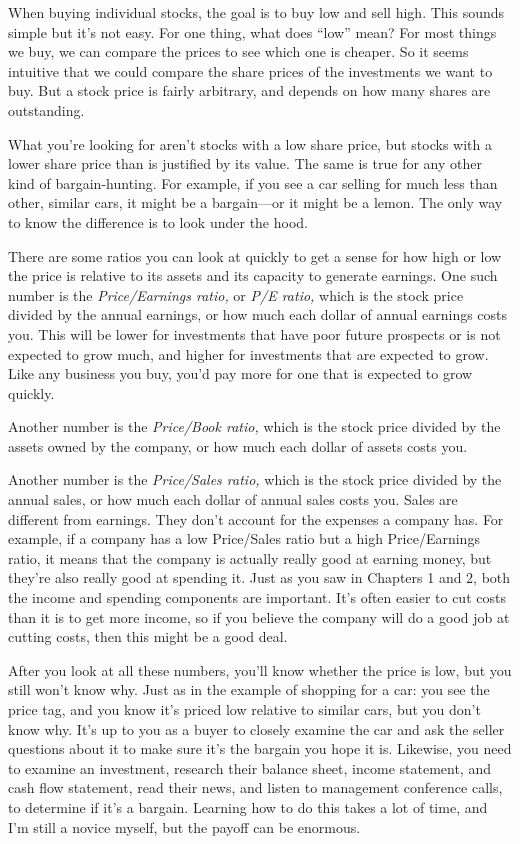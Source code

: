 When buying individual stocks, the goal is to buy low and sell high. This sounds simple but it's not easy. For one thing, what does ``low'' mean? For most things we buy, we can compare the prices to see which one is cheaper. So it seems intuitive that we could compare the share prices of the investments we want to buy. But a stock price is fairly arbitrary, and depends on how many shares are outstanding.

What you're looking for aren't stocks with a low share price, but stocks with a lower share price than is justified by its value. The same is true for any other kind of bargain-hunting. For example, if you see a car selling for much less than other, similar cars, it might be a bargain---or it might be a lemon. The only way to know the difference is to look under the hood.

There are some ratios you can look at quickly to get a sense for how high or low the price is relative to its assets and its capacity to generate earnings. One such number is the \emph{Price/Earnings ratio,} or \emph{P/E ratio,} which is the stock price divided by the annual earnings, or how much each dollar of annual earnings costs you. This will be lower for investments that have poor future prospects or is not expected to grow much, and higher for investments that are expected to grow. Like any business you buy, you'd pay more for one that is expected to grow quickly.

Another number is the \emph{Price/Book ratio,} which is the stock price divided by the assets owned by the company, or how much each dollar of assets costs you.

Another number is the \emph{Price/Sales ratio,} which is the stock price divided by the annual sales, or how much each dollar of annual sales costs you. Sales are different from earnings. They don't account for the expenses a company has. For example, if a company has a low Price/Sales ratio but a high Price/Earnings ratio, it means that the company is actually really good at earning money, but they're also really good at spending it. Just as you saw in Chapters 1 and 2, both the income and spending components are important. It's often easier to cut costs than it is to get more income, so if you believe the company will do a good job at cutting costs, then this might be a good deal.

After you look at all these numbers, you'll know whether the price is low, but you still won't know why. Just as in the example of shopping for a car: you see the price tag, and you know it's priced low relative to similar cars, but you don't know why. It's up to you as a buyer to closely examine the car and ask the seller questions about it to make sure it's the bargain you hope it is. Likewise, you need to examine an investment, research their balance sheet, income statement, and cash flow statement, read their news, and listen to management conference calls, to determine if it's a bargain. Learning how to do this takes a lot of time, and I'm still a novice myself, but the payoff can be enormous.

